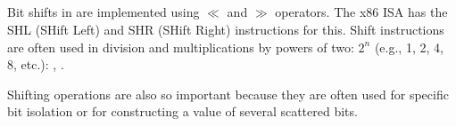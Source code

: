 \subsection{\ShiftsSectionName}

Bit shifts in \CCpp are implemented using $\ll$ and $\gg$ operators.
The x86 \ac{ISA} has the SHL (SHift Left) and SHR (SHift Right) instructions for this.
Shift instructions are often used in division and multiplications by powers of two: $2^{n}$ (e.g., 1, 2, 4, 8, etc.):
,
.


Shifting operations are also so important because they are often used for specific bit isolation
or for constructing a value of several scattered bits.
